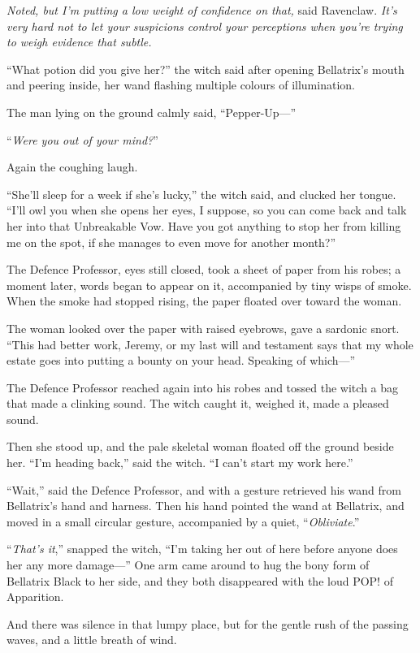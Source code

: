\emph{Noted, but I’m putting a low weight of confidence on that,} said
Ravenclaw. \emph{It’s very hard not to let your suspicions control your
perceptions when you’re trying to weigh evidence that subtle.}

“What potion did you give her?” the witch said after opening Bellatrix’s mouth
and peering inside, her wand flashing multiple colours of illumination.

The man lying on the ground calmly said, “Pepper-Up—”

“\emph{Were you out of your mind?}”

Again the coughing laugh.

“She’ll sleep for a week if she’s lucky,” the witch said, and clucked her
tongue. “I’ll owl you when she opens her eyes, I suppose, so you can come back
and talk her into that Unbreakable Vow. Have you got anything to stop her from
killing me on the spot, if she manages to even move for another month?”

The Defence Professor, eyes still closed, took a sheet of paper from his robes;
a moment later, words began to appear on it, accompanied by tiny wisps of
smoke. When the smoke had stopped rising, the paper floated over toward the
woman.

The woman looked over the paper with raised eyebrows, gave a sardonic snort.
“This had better work, Jeremy, or my last will and testament says that my whole
estate goes into putting a bounty on your head. Speaking of which—”

The Defence Professor reached again into his robes and tossed the witch a bag
that made a clinking sound. The witch caught it, weighed it, made a pleased
sound.

Then she stood up, and the pale skeletal woman floated off the ground beside
her. “I’m heading back,” said the witch. “I can’t start my work here.”

“Wait,” said the Defence Professor, and with a gesture retrieved his wand from
Bellatrix’s hand and harness. Then his hand pointed the wand at Bellatrix, and
moved in a small circular gesture, accompanied by a quiet, “\emph{Obliviate}.”

“\emph{That’s it},” snapped the witch, “I’m taking her out of here before
anyone does her any more damage—” One arm came around to hug the bony form of
Bellatrix Black to her side, and they both disappeared with the loud POP! of
Apparition.

And there was silence in that lumpy place, but for the gentle rush of the
passing waves, and a little breath of wind.

